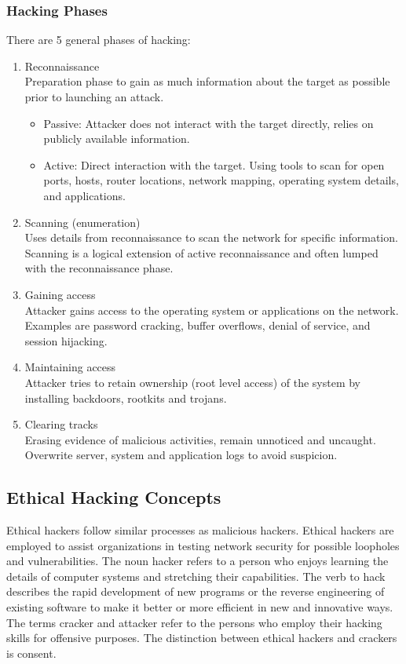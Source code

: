 \subsubsection{Hacking Phases}
There are 5 general phases of hacking:
\begin{enumerate}
    \item Reconnaissance\\
    Preparation phase to gain as much information about the target as possible prior to launching an attack.
    \begin{itemize}
        \item Passive: Attacker does not interact with the target directly, relies on publicly available information.
        \item Active: Direct interaction with the target. Using tools to scan for open ports, hosts, router locations, network mapping, operating system details, and applications.
    \end{itemize}
    \item Scanning (enumeration)\\
    Uses details from reconnaissance to scan the network for specific information.
    Scanning is a logical extension of active reconnaissance and often lumped with the reconnaissance phase.
    \item Gaining access\\
    Attacker gains access to the operating system or applications on the network.
    Examples are password cracking, buffer overflows, denial of service, and session hijacking.
    \item Maintaining access\\
    Attacker tries to retain ownership (root level access) of the system by installing backdoors, rootkits and trojans.
    \item Clearing tracks\\
    Erasing evidence of malicious activities, remain unnoticed and uncaught.
    Overwrite server, system and application logs to avoid suspicion.
\end{enumerate}

\subsection{Ethical Hacking Concepts}
Ethical hackers follow similar processes as malicious hackers.
Ethical hackers are employed to assist organizations in testing network security for possible loopholes and vulnerabilities.
The noun hacker refers to a person who enjoys learning the details of computer systems and stretching their capabilities.
The verb to hack describes the rapid development of new programs or the reverse engineering of existing software to make it better or more efficient in new and innovative ways.
The terms cracker and attacker refer to the persons who employ their hacking skills for offensive purposes.
The distinction between ethical hackers and crackers is consent.

